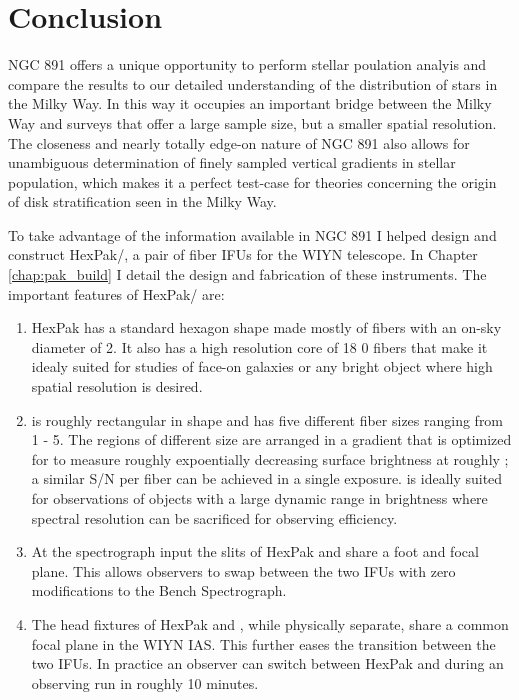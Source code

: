 \chapter[Conclusion]{Conclusion}
\label{chap:conclusion}


\clearpage
NGC 891 offers a unique opportunity to perform stellar poulation
analyis and compare the results to our detailed understanding of the
distribution of stars in the Milky Way. In this way it occupies an
important bridge between the Milky Way and surveys that offer a large
sample size, but a smaller spatial resolution. The closeness and
nearly totally edge-on nature of NGC 891 also allows for unambiguous
determination of finely sampled vertical gradients in stellar
population, which makes it a perfect test-case for theories concerning
the origin of disk stratification seen in the Milky Way.

To take advantage of the information available in NGC 891 I helped
design and construct HexPak/\GP, a pair of fiber IFUs for the WIYN
telescope. In Chapter \ref{chap:pak_build} I detail the design and
fabrication of these instruments. The important features of HexPak/\GP
are:
\begin{enumerate}
\item HexPak has a standard hexagon shape made mostly of fibers with
  an on-sky diameter of 2. It also has a high resolution core
  of 18 0 fibers that make it idealy suited for studies of
  face-on galaxies or any bright object where high spatial resolution
  is desired.

\item \GP is roughly rectangular in shape and has five different fiber
  sizes ranging from 1 - 5. The regions of different
  size are arranged in a gradient that is optimized for to measure
  roughly expoentially decreasing surface brightness at roughly
  ; a similar S/N per fiber can be achieved in a single
  exposure. \GP is ideally suited for observations of objects with a
  large dynamic range in brightness where spectral resolution can be
  sacrificed for observing efficiency.

\item At the spectrograph input the slits of HexPak and \GP share a
  foot and focal plane. This allows observers to swap between the two
  IFUs with zero modifications to the Bench Spectrograph.

\item The head fixtures of HexPak and \GP, while physically separate,
  share a common focal plane in the WIYN IAS. This further eases the
  transition between the two IFUs. In practice an observer can switch
  between HexPak and \GP during an observing run in roughly 10
  minutes.

\end{enumerate}

